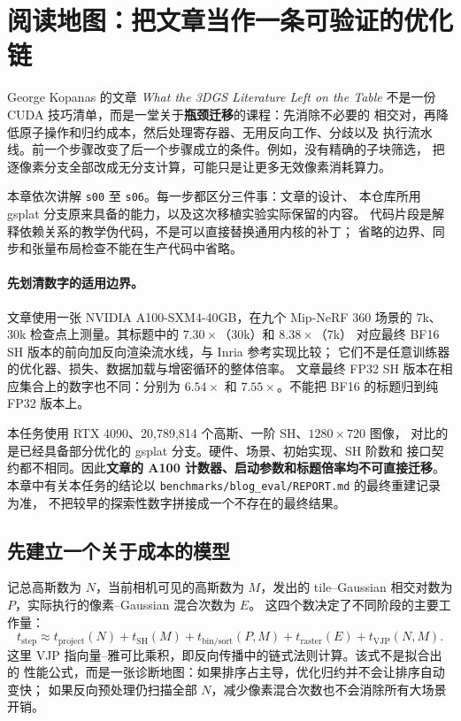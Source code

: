 
\section{阅读地图：把文章当作一条可验证的优化链}

George Kopanas 的文章 \emph{What the 3DGS Literature Left on the Table}
不是一份 CUDA 技巧清单，而是一堂关于\textbf{瓶颈迁移}的课程：先消除不必要的
相交对，再降低原子操作和归约成本，然后处理寄存器、无用反向工作、分歧以及
执行流水线。前一个步骤改变了后一个步骤成立的条件。例如，没有精确的子块筛选，
把逐像素分支全部改成无分支计算，可能只是让更多无效像素消耗算力。

本章依次讲解 \texttt{s00} 至 \texttt{s06}。每一步都区分三件事：文章的设计、
本仓库所用 gsplat 分支原来具备的能力，以及这次移植实验实际保留的内容。
代码片段是解释依赖关系的教学伪代码，不是可以直接替换通用内核的补丁；
省略的边界、同步和张量布局检查不能在生产代码中省略。

\paragraph{先划清数字的适用边界。}
文章使用一张 NVIDIA A100-SXM4-40GB，在九个 Mip-NeRF 360 场景的
7k、30k 检查点上测量。其标题中的 $7.30\times$（30k）和 $8.38\times$（7k）
对应最终 BF16 SH 版本的前向加反向渲染流水线，与 Inria 参考实现比较；
它们不是任意训练器的优化器、损失、数据加载与增密循环的整体倍率。
文章最终 FP32 SH 版本在相应集合上的数字也不同：分别为 $6.54\times$ 和
$7.55\times$。不能把 BF16 的标题归到纯 FP32 版本上。

本任务使用 RTX 4090、20,789,814 个高斯、一阶 SH、$1280\times720$ 图像，
对比的是已经具备部分优化的 gsplat 分支。硬件、场景、初始实现、SH 阶数和
接口契约都不相同。因此\textbf{文章的 A100 计数器、启动参数和标题倍率均不可直接迁移}。
本章中有关本任务的结论以
\texttt{benchmarks/blog\_eval/REPORT.md} 的最终重建记录为准，
不把较早的探索性数字拼接成一个不存在的最终结果。

\subsection{先建立一个关于成本的模型}

记总高斯数为 $N$，当前相机可见的高斯数为 $M$，发出的 tile--Gaussian
相交对数为 $P$，实际执行的像素--Gaussian 混合次数为 $E$。
这四个数决定了不同阶段的主要工作量：
\begin{equation}
 t_{\mathrm{step}}\approx
 t_{\mathrm{project}}(N)+t_{\mathrm{SH}}(M)
 +t_{\mathrm{bin/sort}}(P,M)+t_{\mathrm{raster}}(E)
 +t_{\mathrm{VJP}}(N,M).
\end{equation}
这里 VJP 指向量--雅可比乘积，即反向传播中的链式法则计算。该式不是拟合出的
性能公式，而是一张诊断地图：如果排序占主导，优化归约并不会让排序自动变快；
如果反向预处理仍扫描全部 $N$，减少像素混合次数也不会消除所有大场景开销。


